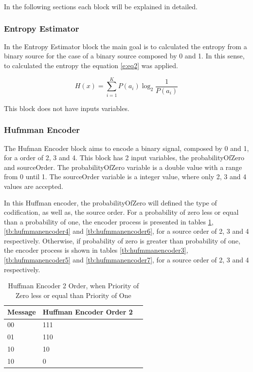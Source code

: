 \begin{refsection}
In the following sections each block will be explained in detailed.


\subsubsection{Entropy Estimator}
In the Entropy Estimator block the main goal is to calculated the entropy from a binary source for the case of a binary source composed by 0 and 1. In this sense, to calculated the entropy the equation \ref{e:eq2} was applied.


\begin{equation}
H(x)=\sum_{i=1}^K P(a_{i})  \log_2\frac{1}{P(a_{i})}
 \label{e:eq2}
\end{equation}

This block does not have inputs variables.

\subsubsection{Hufmman Encoder}
The Hufman Encoder block aims to encode a binary signal, composed by 0 and 1, for a order of 2, 3 and 4. This block has 2 input variables, the probabilityOfZero and sourceOrder. 
The probabilityOfZero variable is a double value with a range from 0 until 1. The sourceOrder variable is a integer value, where only 2, 3 and 4 values are accepted.

In this Huffman encoder, the probabilityOfZero will defined the type of codification, as well as, the source order. For a probability of zero less or equal than a probability of one, the encoder process is presented in tables \ref{tb:hufmmanencoder2}, \ref{tb:hufmmanencoder4} and \ref{tb:hufmmanencoder6}, for a source order of 2, 3 and 4 respectively.
Otherwise, if probability of zero is greater than probability of one, the encoder process is shown in tables \ref{tb:hufmmanencoder3}, \ref{tb:hufmmanencoder5} and \ref{tb:hufmmanencoder7}, for a source order of 2, 3 and 4 respectively.

\begin{table}[H]
\centering
\caption{Huffman Encoder 2 Order, when Priority of Zero less or equal than Priority of One}
\label{tb:hufmmanencoder2}
\begin{tabular}{|l|l|l|}
\hline
\textbf{Message}                      & \textbf{Huffman Encoder Order 2}                                       \\ \hline
00                 & 111                                                          \\ \hline
01                 & 110                                                          \\ \hline
10                 & 10                                                         \\ \hline
10                 & 0                                                         \\ \hline


\end{tabular}
\end{table}
\end{refsection}
